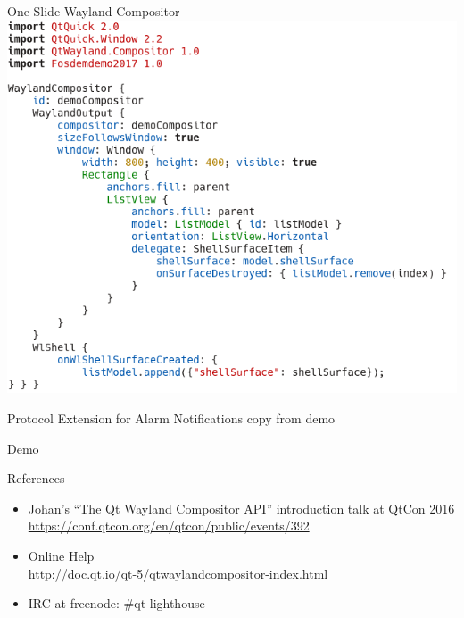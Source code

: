 \documentclass[ucs,9pt]{beamer}
\begin{document}
\begin{frame}[fragile]
    {One-Slide Wayland Compositor}
    \vspace{-1em}
    \includegraphics[height=.8\paperheight]{OneSlideCompositor.png}
\end{frame}

\begin{frame}
    {Protocol Extension for Alarm Notifications}
    \alert{copy from demo}
\end{frame}

\begin{frame}
    {Demo}
\end{frame}

\begin{frame}
    {References}

    \begin{itemize}
        \item Johan's ``The Qt Wayland Compositor API'' introduction talk at QtCon 2016\\
            \url{https://conf.qtcon.org/en/qtcon/public/events/392}
        \item Online Help\\
            \url{http://doc.qt.io/qt-5/qtwaylandcompositor-index.html}
        \item IRC at freenode: \#qt-lighthouse
    \end{itemize}
\end{frame}

\KDElastframe
\end{document}
